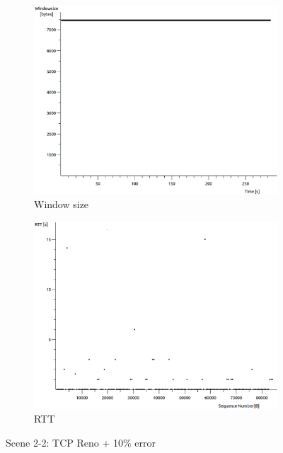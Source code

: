 \documentclass[conference,a4paper]{IEEEtran}
\begin{document}
\begin{figure}
\begin{subfigure}[b]{0.2\textwidth}
  \includegraphics[width=\textwidth]{s2-2_wnd}
  \caption{Window size}
 \end{subfigure}
 \begin{subfigure}[b]{0.2\textwidth}
  \includegraphics[width=\textwidth]{s2-2_rtt}
  \caption{RTT}
 \end{subfigure}
 \caption{Scene 2-2: TCP Reno + 10\% error}
\end{figure}
\end{document}
